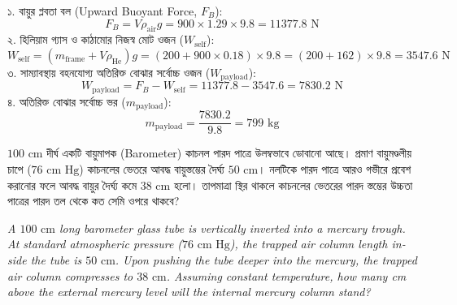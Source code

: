 \documentclass[12pt, a4paper]{article}
\begin{document}
\vspace{1em}

\begin{tcolorbox}[solutionbox={সমাধান (Solution)}]
\noindent
১. বায়ুর প্লবতা বল (Upward Buoyant Force, $F_B$):
\[ F_B = V \rho_{\text{air}} g = 900 \times 1.29 \times 9.8 = 11377.8\text{ N} \]
২. হিলিয়াম গ্যাস ও কাঠামোর নিজস্ব মোট ওজন ($W_{\text{self}}$):
\[ W_{\text{self}} = (m_{\text{frame}} + V \rho_{\text{He}}) g = (200 + 900 \times 0.18) \times 9.8 = (200 + 162) \times 9.8 = 3547.6\text{ N} \]
৩. সাম্যাবস্থায় বহনযোগ্য অতিরিক্ত বোঝার সর্বোচ্চ ওজন ($W_{\text{payload}}$):
\[ W_{\text{payload}} = F_B - W_{\text{self}} = 11377.8 - 3547.6 = 7830.2\text{ N} \]
৪. অতিরিক্ত বোঝার সর্বোচ্চ ভর ($m_{\text{payload}}$):
\[ m_{\text{payload}} = \frac{7830.2}{9.8} = 799\text{ kg} \]
\end{tcolorbox}

\vspace{1.5em}



\begin{tcolorbox}[questionbox={প্রশ্ন (Question) 9}]
\noindent
$100\text{ cm}$ দীর্ঘ একটি বায়ুমাপক (Barometer) কাচনল পারদ পাত্রে উলম্বভাবে ডোবানো আছে। প্রমাণ বায়ুমণ্ডলীয় চাপে ($76\text{ cm Hg}$) কাচনলের ভেতরে আবদ্ধ বায়ুস্তম্ভের দৈর্ঘ্য $50\text{ cm}$। নলটিকে পারদ পাত্রে আরও গভীরে প্রবেশ করানোর ফলে আবদ্ধ বায়ুর দৈর্ঘ্য কমে $38\text{ cm}$ হলো। তাপমাত্রা স্থির থাকলে কাচনলের ভেতরের পারদ স্তম্ভের উচ্চতা পাত্রের পারদ তল থেকে কত সেমি ওপরে থাকবে?

\vspace{0.8em}
\begin{english}
\noindent\textit{\color{darkgray}
A $100\text{ cm}$ long barometer glass tube is vertically inverted into a mercury trough. At standard atmospheric pressure ($76\text{ cm Hg}$), the trapped air column length inside the tube is $50\text{ cm}$. Upon pushing the tube deeper into the mercury, the trapped air column compresses to $38\text{ cm}$. Assuming constant temperature, how many cm above the external mercury level will the internal mercury column stand?
}
\end{english}
\end{tcolorbox}

\vspace{1em}
\end{document}
